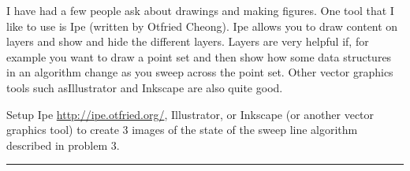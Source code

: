 \documentclass[11pt]{article}
\begin{document}

I have had a few people ask about drawings and making figures.  One tool that I
like to use is Ipe (written by Otfried Cheong).  Ipe allows you to draw content
on layers and show and hide the different layers.  Layers are very helpful if,
for example you want to draw a point set and then show how some data structures
in an algorithm change as you sweep across the point set.
Other vector graphics tools such asIllustrator and Inkscape are also quite good.

Setup Ipe \url{http://ipe.otfried.org/}, Illustrator, or Inkscape
(or another vector graphics tool)
to create 3 images of the state of the sweep line algorithm
described in problem 3.

\hrule
\end{document}
